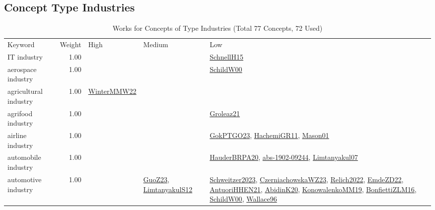 \subsection{Concept Type Industries}
\label{sec:Industries}
\label{Industries}
{\scriptsize
\begin{longtable}{p{3cm}r>{\raggedright\arraybackslash}p{6cm}>{\raggedright\arraybackslash}p{6cm}>{\raggedright\arraybackslash}p{8cm}}
\rowcolor{white}\caption{Works for Concepts of Type Industries (Total 77 Concepts, 72 Used)}\\ \toprule
\rowcolor{white}Keyword & Weight & High & Medium & Low\\ \midrule\endhead
\bottomrule
\endfoot
\index{IT industry}\index{Industries!IT industry}IT industry &  1.00 &  &  & \hyperref[detail:SchnellH15]{SchnellH15}\\
\index{aerospace industry}\index{Industries!aerospace industry}aerospace industry &  1.00 &  &  & \hyperref[detail:SchildW00]{SchildW00}\\
\index{agricultural industry}\index{Industries!agricultural industry}agricultural industry &  1.00 & \hyperref[detail:WinterMMW22]{WinterMMW22} &  & \\
\index{agrifood industry}\index{Industries!agrifood industry}agrifood industry &  1.00 &  &  & \hyperref[detail:Groleaz21]{Groleaz21}\\
\index{airline industry}\index{Industries!airline industry}airline industry &  1.00 &  &  & \hyperref[detail:GokPTGO23]{GokPTGO23}, \hyperref[detail:HachemiGR11]{HachemiGR11}, \hyperref[detail:Mason01]{Mason01}\\
\index{automobile industry}\index{Industries!automobile industry}automobile industry &  1.00 &  &  & \hyperref[detail:HauderBRPA20]{HauderBRPA20}, \hyperref[detail:abs-1902-09244]{abs-1902-09244}, \hyperref[detail:Limtanyakul07]{Limtanyakul07}\\
\index{automotive industry}\index{Industries!automotive industry}automotive industry &  1.00 &  & \hyperref[detail:GuoZ23]{GuoZ23}, \hyperref[detail:LimtanyakulS12]{LimtanyakulS12} & \hyperref[detail:Schweitzer2023]{Schweitzer2023}, \hyperref[detail:CzerniachowskaWZ23]{CzerniachowskaWZ23}, \hyperref[detail:Relich2022]{Relich2022}, \hyperref[detail:EmdeZD22]{EmdeZD22}, \hyperref[detail:AntuoriHHEN21]{AntuoriHHEN21}, \hyperref[detail:AbidinK20]{AbidinK20}, \hyperref[detail:KonowalenkoMM19]{KonowalenkoMM19}, \hyperref[detail:BonfiettiZLM16]{BonfiettiZLM16}, \hyperref[detail:SchildW00]{SchildW00}, \hyperref[detail:Wallace96]{Wallace96}\\

\end{longtable}}
